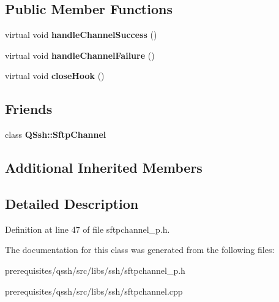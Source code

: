 \subsection*{Public Member Functions}
\begin{DoxyCompactItemize}
\item 
\mbox{\label{class_q_ssh_1_1_internal_1_1_sftp_channel_private_a4409424132f41b19eb2542e95cd9f3fd}} 
virtual void {\bfseries handle\+Channel\+Success} ()
\item 
\mbox{\label{class_q_ssh_1_1_internal_1_1_sftp_channel_private_ac8d0715b2950ba59c3a81d42f5664a8e}} 
virtual void {\bfseries handle\+Channel\+Failure} ()
\item 
\mbox{\label{class_q_ssh_1_1_internal_1_1_sftp_channel_private_a2147c7af0fb87b3aec52000912a92ff3}} 
virtual void {\bfseries close\+Hook} ()
\end{DoxyCompactItemize}
\subsection*{Friends}
\begin{DoxyCompactItemize}
\item 
\mbox{\label{class_q_ssh_1_1_internal_1_1_sftp_channel_private_aa763485a9e37c26a73d220e5010e63fe}} 
class {\bfseries Q\+Ssh\+::\+Sftp\+Channel}
\end{DoxyCompactItemize}
\subsection*{Additional Inherited Members}


\subsection{Detailed Description}


Definition at line 47 of file sftpchannel\+\_\+p.\+h.



The documentation for this class was generated from the following files\+:\begin{DoxyCompactItemize}
\item 
prerequisites/qssh/src/libs/ssh/sftpchannel\+\_\+p.\+h\item 
prerequisites/qssh/src/libs/ssh/sftpchannel.\+cpp\end{DoxyCompactItemize}
